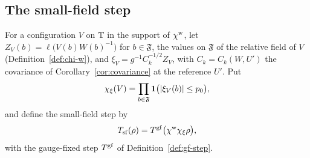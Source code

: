 \subsection{The small-field step}\label{subsec:cl-step}

\begin{definition}\label{def:small-field-step}
For a configuration $V$ on $\mathbb T$ in the support of $\chi^{\rm w}$, let $Z_V(b)=\ell\big(V(b)W(b)^{-1}\big)$ for $b\in\mathfrak F$, the values on $\mathfrak F$ of the relative field of $V$ (Definition~\ref{def:chi-w}), and $\xi_V=g^{-1}C_k^{-1/2}Z_V$, with $C_k=C_k(W,U')$ the covariance of Corollary~\ref{cor:covariance} at the reference $U'$. Put
\[
\chi_\xi(V)=\prod_{b\in\mathfrak F}\mathbf 1\big(|\xi_V(b)|\le p_0\big),
\]
and define the small-field step by
\[
T_{\rm sf}(\rho)=T^{\rm gf}\big(\chi^{\rm w}\chi_\xi\rho\big),
\]
with the gauge-fixed step $T^{\rm gf}$ of Definition~\ref{def:gf-step}.
\end{definition}

